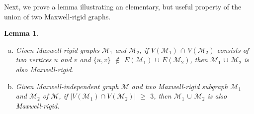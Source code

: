 \documentclass[10pt]{article}
\def\M{\mathcal {M}}
\newtheorem{lem}{Lemma}
\begin{document}
Next, we prove a lemma illustrating an elementary, but useful property of the union of two Maxwell-rigid graphs.
\begin{lem}\label{lem:join}
\begin{enumerate}[(a)]
\item \label{lem:join1} Given Maxwell-rigid graphs $\M_1$ and $\M_2$, if $V(\M_1)$ $\cap$ $V(\M_2)$ consists of two vertices $u$ and $v$ and $\{u, v\}$ $\not\in$ $E(\M_1)$ $\cup$ $E(\M_2)$, then $\M_1$ $\cup$ $\M_2$ is also Maxwell-rigid. 
\item \label{lem:join2} Given Maxwell-independent graph $\M$ and two Maxwell-rigid subgraph $\M_1$ and $\M_2$ of $\M$, if $|V(\M_1) \cap V(\M_2)|$ $\ge$ $3$, then $\M_1$ $\cup$ $\M_2$ is also Maxwell-rigid.
\end{enumerate}

\end{lem}
\end{document}
